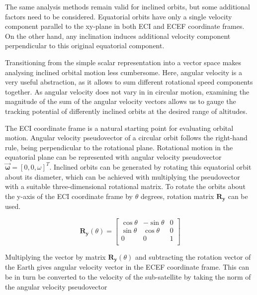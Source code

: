 \documentclass[english, 12pt, a4paper, elec, utf8, a-1b, online]{aaltothesis}
\begin{document}
The same analysis methods remain valid for inclined orbits, but some additional factors need to be considered.
Equatorial orbits have only a single velocity component parallel to the xy-plane in both ECI and ECEF coordinate frames.
On the other hand, any inclination induces additional velocity component perpendicular to this original equatorial component.

Transitioning from the simple scalar representation into a vector space makes analysing inclined orbital motion less cumbersome.
Here, angular velocity is a very useful abstraction, as it allows to sum different rotational speed components together.
As angular velocity does not vary in in circular motion, examining the magnitude of the sum of the angular velocity vectors allows us to gauge the tracking potential of differently inclined orbits at the desired range of altitudes.

The ECI coordinate frame is a natural starting point for evaluating orbital motion.
Angular velocity pseudovector of a circular orbit follows the right-hand rule, being perpendicular to the rotational plane.
Rotational motion in the equatorial plane can be represented with angular velocity pseudovector $\bm{\vec{\omega}} = [0,0,\omega]^T$.
Inclined orbits can be generated by rotating this equatorial orbit about its diameter, which can be achieved with multiplying the pseudovector with a suitable three-dimensional rotational matrix.
To rotate the orbits about the y-axis of the ECI coordinate frame by $\theta$ degrees, rotation matrix $\bm{R_y}$ can be used.

\begin{equation*}
  \bm{R_y}(\theta) = \begin{bmatrix}
    \cos \theta & -\sin \theta & 0 \\[3pt]
    \sin \theta &  \cos \theta & 0 \\[3pt]
    0           &  0           & 1 \\
    \end{bmatrix}
\end{equation*}

Multiplying the vector by matrix $\bm{R_y}(\theta)$ and subtracting the rotation vector of the Earth gives angular velocity vector in the ECEF coordinate frame.
This can be in turn be converted to the velocity of the sub-satellite by taking the norm of the angular velocity pseudovector
\end{document}
